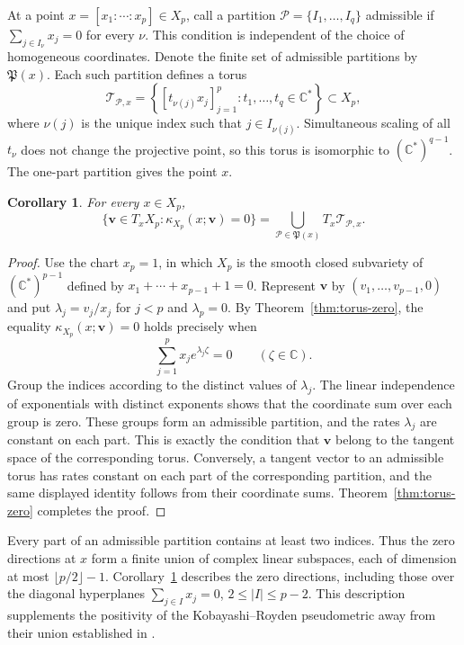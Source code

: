 \documentclass[12pt,letterpaper,reqno]{amsart}
\newtheorem{cor}[thm]{Corollary}
\theoremstyle{definition}
\numberwithin{equation}{section}
\newcommand{\C}{\mathbb C}
\begin{document}
	At a point $x=[x_1:\cdots:x_p]\in X_p$, call a partition
	$\mathcal P=\{I_1,\ldots,I_q\}$ admissible if
	$\sum_{j\in I_\nu}x_j=0$ for every $\nu$. This condition is
	independent of the choice of homogeneous coordinates. Denote the
	finite set of admissible partitions by $\mathfrak P(x)$. Each such
	partition defines a torus
	\[
	\mathcal T_{\mathcal P,x}
	=\left\{[t_{\nu(j)}x_j]_{j=1}^p:
	t_1,\ldots,t_q\in\C^*\right\}\subset X_p,
	\]
	where $\nu(j)$ is the unique index such that $j\in I_{\nu(j)}$. Simultaneous scaling of
	all $t_\nu$ does not change the projective point, so this torus is
	isomorphic to $(\C^*)^{q-1}$. The one-part partition gives the
	point $x$.
	
	\begin{cor}\label{cor:projective-zero-directions}
		For every $x\in X_p$,
		\[
		\{\bm{v}\in T_xX_p:\kappa_{X_p}(x;\bm{v})=0\}
		=\bigcup_{\mathcal P\in\mathfrak P(x)}
		T_x\mathcal T_{\mathcal P,x}.
		\]
	\end{cor}
	
	\begin{proof}
		Use the chart $x_p=1$, in which $X_p$ is the smooth closed
		subvariety of $(\C^*)^{p-1}$ defined by
		$x_1+\cdots+x_{p-1}+1=0$. Represent $\bm{v}$ by
		$(v_1,\ldots,v_{p-1},0)$ and put
		$\lambda_j=v_j/x_j$ for $j<p$ and $\lambda_p=0$.
		By Theorem~\ref{thm:torus-zero}, the equality
		$\kappa_{X_p}(x;\bm{v})=0$ holds precisely when
		\[
		\sum_{j=1}^p x_j e^{\lambda_j\zeta}=0
		\qquad(\zeta\in\C).
		\]
		Group the indices according to the distinct values of $\lambda_j$.
		The linear independence of exponentials with distinct exponents
		shows that the coordinate sum over each group is zero.
		These groups form an admissible partition, and the rates
		$\lambda_j$ are constant on each part. This is exactly the
		condition that $\bm{v}$ belong to the tangent space of the corresponding
		torus. Conversely, a tangent vector to an admissible torus has rates
		constant on each part of the corresponding partition, and the same displayed identity follows
		from their coordinate sums. Theorem~\ref{thm:torus-zero} completes
		the proof.
	\end{proof}
	
	Every part of an admissible partition contains at least two indices. Thus the zero
	directions at $x$ form a finite union of complex linear subspaces,
	each of dimension at most $\lfloor p/2\rfloor-1$.
	Corollary~\ref{cor:projective-zero-directions} describes the zero
	directions, including those over the diagonal hyperplanes
	$\sum_{j\in I}x_j=0$, $2\le|I|\le p-2$. This description supplements the positivity of the Kobayashi--Royden pseudometric
	away from their union established in \cite[Theorem~3 and Theorem~6]{KK73}.
	
\end{document}
